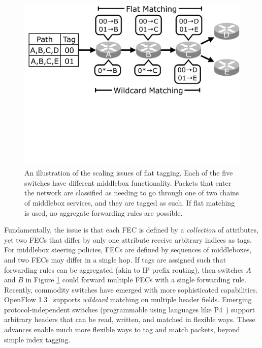 \begin{figure}[t!] 
\begin{minipage}{1\linewidth}
\includegraphics[trim={0 11.5cm 0 0}, clip, width=\linewidth]{figures/mbox_path_example}
\end{minipage} 
\caption{An illustration of the scaling issues of flat tagging. Each of the five switches have different middlebox functionality. Packets that enter the network are classified as needing to go through one of two chains of middlebox services, and they are tagged as such. If flat matching is used, no aggregate forwarding rules are possible.  }
\label{fig:mbox_path}
\end{figure}
Fundamentally, the issue is that each FEC is defined by a \emph{collection} of attributes, yet two FECs that differ by only one attribute receive arbitrary indices as tags. For middlebox steering policies, FECs are defined by sequences of middleboxes, and two FECs may differ in a single hop.  If tags are assigned such that forwarding rules can be aggregated (akin to IP prefix routing), then switches $A$ and $B$ in Figure \ref{fig:mbox_path} could forward multiple FECs with a single forwarding rule.
Recently, commodity switches have emerged with more sophisticated capabilities.  OpenFlow 1.3~\cite{of13} supports \emph{wildcard} matching on multiple header fields. Emerging protocol-independent switches (programmable using languages like P4~\cite{P4}) support arbitrary headers that can be read, written, and matched in flexible ways.  These advances enable much more flexible ways to tag and match packets, beyond simple index tagging. 

